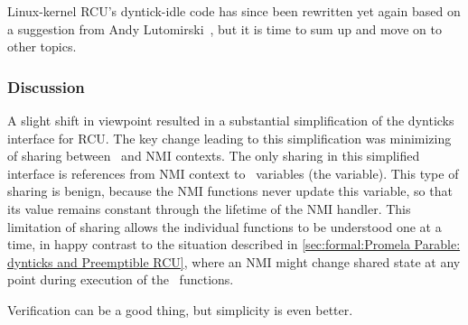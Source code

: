 \QuickQuizEnd

Linux-kernel RCU's dyntick-idle code has since been rewritten yet again
based on a suggestion from
Andy Lutomirski~\cite{PaulMcKenney2015dyntickAndyNMI},
but it is time to sum up and move on to other topics.

\subsubsection{Discussion}
\label{sec:formal:Discussion}

A slight shift in viewpoint resulted in a substantial simplification
of the dynticks interface for RCU.
The key change leading to this simplification was minimizing of
sharing between \IRQ\ and NMI contexts.
The only sharing in this simplified interface is references from NMI
context to \IRQ\ variables (the  variable).
This type of sharing is benign, because the NMI functions never update
this variable, so that its value remains constant through the lifetime
of the NMI handler.
This limitation of sharing allows the individual functions to be
understood one at a time, in happy contrast to the situation
described in
\cref{sec:formal:Promela Parable: dynticks and Preemptible RCU},
where an NMI might change shared state at any point during execution of
the \IRQ\ functions.

Verification can be a good thing, but simplicity is even better.


